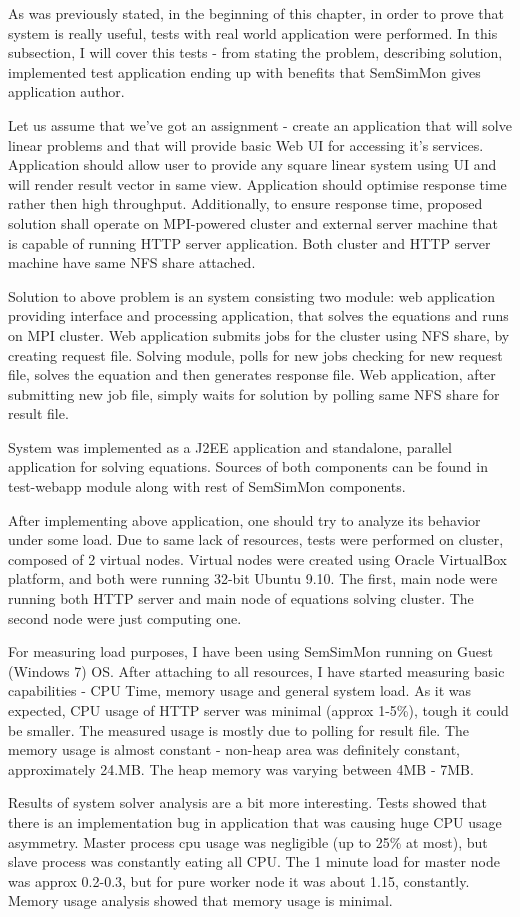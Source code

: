 As was previously stated, in the beginning of this chapter, in order to prove that system is really useful, tests with real world application were performed. In this subsection, I will cover this tests - from stating the problem, describing solution, implemented test application ending up with benefits that SemSimMon gives application author.

Let us assume that we\rq{}ve got an assignment - create an application that will solve linear problems and that will provide basic Web UI for accessing it\rq{}s services. Application should allow user to provide any square linear system using UI and will render result vector in same view. Application should optimise response time rather then high throughput. Additionally, to ensure response time, proposed solution shall operate on MPI-powered cluster and external server machine that is capable of running HTTP server application. Both cluster and HTTP server machine have same NFS share attached.  

Solution to above problem is an system consisting two module: web application providing interface and processing application, that solves the equations and runs on MPI cluster. Web application submits jobs for the cluster using NFS share, by creating request file. Solving module, polls for new jobs checking for new request file, solves the equation and then generates response file. Web application, after submitting new job file, simply waits for solution by polling same NFS share for result file. 

System was implemented as a J2EE application and standalone, parallel application for solving equations. Sources of both components can be found in test-webapp module along with rest of SemSimMon components.

After implementing above application, one should try to analyze its behavior under some load. Due to same lack of resources, tests were performed on cluster, composed of 2 virtual nodes. Virtual nodes were created using Oracle VirtualBox platform, and both were running 32-bit Ubuntu 9.10. The first, main node were running both HTTP server and main node of equations solving cluster. The second node were just computing one.

For measuring load purposes, I have been using SemSimMon running on Guest (Windows 7) OS. After attaching to all resources, I have started measuring basic capabilities - CPU Time, memory usage and general system load. As it was expected, CPU usage of HTTP server was minimal (approx 1-5\%), tough it could be smaller. The measured usage is mostly due to polling for result file. The memory usage is almost constant - non-heap area was definitely constant, approximately 24.MB. The heap memory was varying between 4MB - 7MB.

Results of system solver analysis are a bit more interesting. Tests showed that there is an implementation bug in application that was causing huge CPU usage asymmetry. Master process cpu usage was negligible (up to 25\% at most), but slave process was constantly eating all CPU. The 1 minute load for master node was approx 0.2-0.3, but for pure worker node it was about 1.15, constantly. Memory usage analysis showed that memory usage is minimal. 


